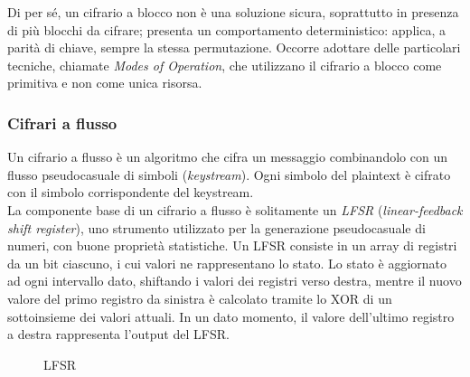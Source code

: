 \documentclass[target=bach,aauheader=,style=]{thud}
\begin{document}
            Di per sé, un cifrario a blocco non è una soluzione sicura, soprattutto in presenza di più blocchi da cifrare; presenta un comportamento deterministico: applica, a parità di chiave, sempre la stessa permutazione. Occorre adottare delle particolari tecniche, chiamate \textit{Modes of Operation}, che utilizzano il cifrario a blocco come primitiva e non come unica risorsa. \cite{handcypto, computernet}
            
            \subsubsection{Cifrari a flusso}
            Un cifrario a flusso è un algoritmo che cifra un messaggio combinandolo con un flusso pseudocasuale di simboli (\textit{keystream}). Ogni simbolo del plaintext è cifrato con il simbolo corrispondente del keystream.\\
            La componente base di un cifrario a flusso è solitamente un \textit{LFSR} (\textit{linear-feedback shift register}), uno strumento utilizzato per la generazione pseudocasuale di numeri, con buone proprietà statistiche. Un LFSR consiste in un array di registri da un bit ciascuno, i cui valori ne rappresentano lo stato. Lo stato è aggiornato ad ogni intervallo dato, shiftando i valori dei registri verso destra, mentre il nuovo valore del primo registro da sinistra è calcolato tramite lo XOR di un sottoinsieme dei valori attuali. In un dato momento, il valore dell'ultimo registro a destra rappresenta l'output del LFSR.\cite{moderncrypto}
            \begin{figure}[htbp]
                \centering
                \caption{LFSR}
                \label{fig:lfsr}
            \end{figure}
\end{document}
